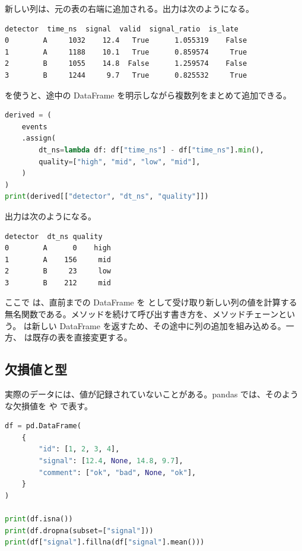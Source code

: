新しい列は、元の表の右端に追加される。出力は次のようになる。

\begin{lstlisting}[numbers=none, xleftmargin=2\zw]
  detector  time_ns  signal  valid  signal_ratio  is_late
0        A     1032    12.4   True      1.055319    False
1        A     1188    10.1   True      0.859574     True
2        B     1055    14.8  False      1.259574    False
3        B     1244     9.7   True      0.825532     True
\end{lstlisting}

 を使うと、途中の DataFrame を明示しながら複数列をまとめて追加できる。

\begin{lstlisting}[language=Python]
derived = (
    events
    .assign(
        dt_ns=lambda df: df["time_ns"] - df["time_ns"].min(),
        quality=["high", "mid", "low", "mid"],
    )
)
print(derived[["detector", "dt_ns", "quality"]])
\end{lstlisting}

出力は次のようになる。

\begin{lstlisting}[numbers=none, xleftmargin=2\zw]
  detector  dt_ns quality
0        A      0    high
1        A    156     mid
2        B     23     low
3        B    212     mid
\end{lstlisting}

ここで  は、直前までの DataFrame を  として受け取り新しい列の値を計算する無名関数である。メソッドを続けて呼び出す書き方を、メソッドチェーンという。 は新しい DataFrame を返すため、その途中に列の追加を組み込める。一方、 は既存の表を直接変更する。

\subsection{欠損値と型}

実際のデータには、値が記録されていないことがある。pandas では、そのような欠損値を  や  で表す。

\begin{lstlisting}[language=Python]
df = pd.DataFrame(
    {
        "id": [1, 2, 3, 4],
        "signal": [12.4, None, 14.8, 9.7],
        "comment": ["ok", "bad", None, "ok"],
    }
)

print(df.isna())
print(df.dropna(subset=["signal"]))
print(df["signal"].fillna(df["signal"].mean()))
\end{lstlisting}

